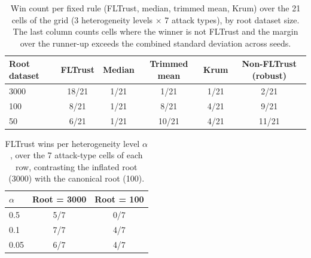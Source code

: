 
\begin{table}[t]
\centering
\caption{Win count per fixed rule (FLTrust, median, trimmed mean, Krum) over the 21 cells of the grid (3 heterogeneity levels $\times$ 7 attack types), by root dataset size. The last column counts cells where the winner is not FLTrust and the margin over the runner-up exceeds the combined standard deviation across seeds.}
\label{tab:root-size-wins}
\begin{tabular}{lccccc}
\toprule
Root dataset & FLTrust & Median & Trimmed mean & Krum & Non-FLTrust (robust) \\
\midrule
3000 & 18/21 & 1/21 & 1/21 & 1/21 & 2/21 \\
100 & 8/21 & 1/21 & 8/21 & 4/21 & 9/21 \\
50 & 6/21 & 1/21 & 10/21 & 4/21 & 11/21 \\
\bottomrule
\end{tabular}
\end{table}

\begin{table}[t]
\centering
\caption{FLTrust wins per heterogeneity level $\alpha$, over the 7 attack-type cells of each row, contrasting the inflated root (3000) with the canonical root (100).}
\label{tab:fltrust-by-alpha}
\begin{tabular}{lcc}
\toprule
$\alpha$ & Root = 3000 & Root = 100 \\
\midrule
0.5 & 5/7 & 0/7 \\
0.1 & 7/7 & 4/7 \\
0.05 & 6/7 & 4/7 \\
\bottomrule
\end{tabular}
\end{table}

